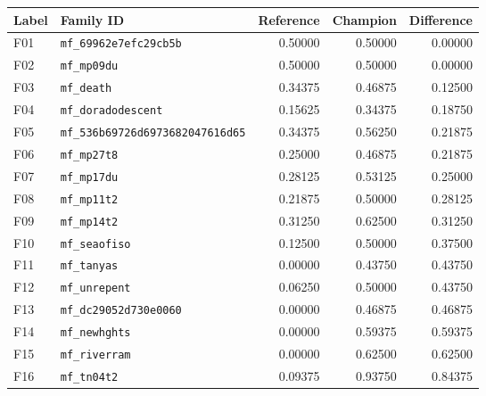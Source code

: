 \begin{tabular}{@{}llrrr@{}}
\toprule
Label & Family ID & Reference & Champion & Difference \\
\midrule
F01 & \texttt{mf\_69962e7efc29cb5b} & 0.50000 & 0.50000 & 0.00000 \\
F02 & \texttt{mf\_mp09du} & 0.50000 & 0.50000 & 0.00000 \\
F03 & \texttt{mf\_death} & 0.34375 & 0.46875 & 0.12500 \\
F04 & \texttt{mf\_doradodescent} & 0.15625 & 0.34375 & 0.18750 \\
F05 & \texttt{mf\_536b69726d6973682047616d65} & 0.34375 & 0.56250 & 0.21875 \\
F06 & \texttt{mf\_mp27t8} & 0.25000 & 0.46875 & 0.21875 \\
F07 & \texttt{mf\_mp17du} & 0.28125 & 0.53125 & 0.25000 \\
F08 & \texttt{mf\_mp11t2} & 0.21875 & 0.50000 & 0.28125 \\
F09 & \texttt{mf\_mp14t2} & 0.31250 & 0.62500 & 0.31250 \\
F10 & \texttt{mf\_seaofiso} & 0.12500 & 0.50000 & 0.37500 \\
F11 & \texttt{mf\_tanyas} & 0.00000 & 0.43750 & 0.43750 \\
F12 & \texttt{mf\_unrepent} & 0.06250 & 0.50000 & 0.43750 \\
F13 & \texttt{mf\_dc29052d730e0060} & 0.00000 & 0.46875 & 0.46875 \\
F14 & \texttt{mf\_newhghts} & 0.00000 & 0.59375 & 0.59375 \\
F15 & \texttt{mf\_riverram} & 0.00000 & 0.62500 & 0.62500 \\
F16 & \texttt{mf\_tn04t2} & 0.09375 & 0.93750 & 0.84375 \\
\bottomrule
\end{tabular}
